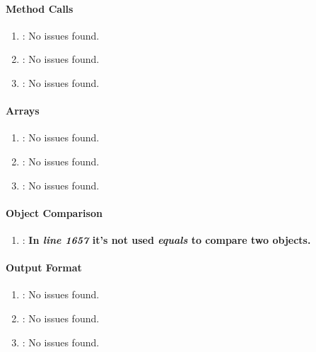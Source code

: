 \paragraph{Method Calls} %
\label{par:method_calls}

\begin{enumerate} [resume]
	\item \emph{\checkAH}: No issues found.
	\item \emph{\checkAI}: No issues found.
	\item \emph{\checkAJ}: No issues found.
\end{enumerate}

\paragraph{Arrays} %
\label{par:arrays}

\begin{enumerate} [resume]
	\item \emph{\checkAK}: No issues found.
	\item \emph{\checkAL}: No issues found.
	\item \emph{\checkAM}: No issues found.
\end{enumerate}

\paragraph{Object Comparison} %
\label{par:object_comparison}

\begin{enumerate} [resume]
	\item \emph{\checkAN}: \textbf{In \emph{line 1657} it's not used \emph{equals} to compare two objects.}
\end{enumerate}

\paragraph{Output Format} %
\label{par:output_format}

\begin{enumerate} [resume]
	\item \emph{\checkAO}: No issues found.
	\item \emph{\checkAP}: No issues found.
	\item \emph{\checkAQ}: No issues found.
\end{enumerate}

